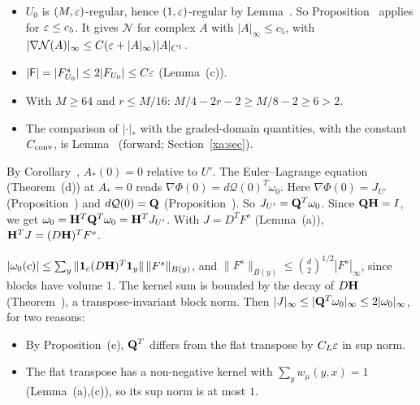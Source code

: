 \begin{detail}\label{d9:crit-current}
\begin{step}
\begin{itemize}
\item $U_0$ is $(M,\varepsilon)$-regular, hence $(1,\varepsilon)$-regular by Lemma~. So Proposition~ applies for $\varepsilon\le c_5$. It gives $\mathcal N$ for complex $A$ with $|A|_\infty\le c_5$, with $|\nabla\mathcal N(A)|_\infty\le C(\varepsilon+|A|_\infty)|A|_{C^1}$.
\item $|\mathsf F|=|F^s_{U_0}|\le2|F_{U_0}|\le C\varepsilon$ (Lemma~(c)).
\item With $M\ge64$ and $r\le M/16$: $M/4-2r-2\ge M/8-2\ge6>2$.
\item The comparison of $|\cdot|_*$ with the graded-domain quantities, with the constant $C_{\rm conv}$, is Lemma~ (forward; Section~\ref{xa:sec}).
\end{itemize}
\end{step}
\begin{step}
By Corollary~, $A_*(0)=0$ relative to $U'$. The Euler--Lagrange equation (Theorem~(d)) at $A_*=0$ reads $\nabla\Phi(0)=d\mathcal Q(0)^T\omega_0$. Here $\nabla\Phi(0)=J_{U'}$ (Proposition~) and $d\mathcal Q(0)=\mathbf Q$ (Proposition~). So $J_{U'}=\mathbf Q^T\omega_0$. Since $\mathbf Q\mathbf H=I$, we get $\omega_0=\mathbf H^T\mathbf Q^T\omega_0=\mathbf H^TJ_{U'}$. With $J=D^TF^s$ (Lemma~(a)), $\mathbf H^TJ=(D\mathbf H)^TF^s$.
\end{step}
\begin{step}
$|\omega_0(c)|\le\sum_y\|\mathbf 1_c(D\mathbf H)^T\mathbf 1_y\|\,\|F^s\|_{B(y)}$, and $\|F^s\|_{B(y)}\le\binom d2^{1/2}|F^s|_\infty$, since blocks have volume $1$. The kernel sum is bounded by the decay of $D\mathbf H$ (Theorem~), a transpose-invariant block norm. Then $|J|_\infty\le|\mathbf Q^T\omega_0|_\infty\le2|\omega_0|_\infty$, for two reasons:
\begin{itemize}
\item By Proposition~(e), $\mathbf Q^T$ differs from the flat transpose by $C_L\varepsilon$ in sup norm.
\item The flat transpose has a non-negative kernel with $\sum_yw_\mu(y,x)=1$ (Lemma~(a),(c)), so its sup norm is at most $1$.

\end{itemize}
\end{step}
\end{detail}
